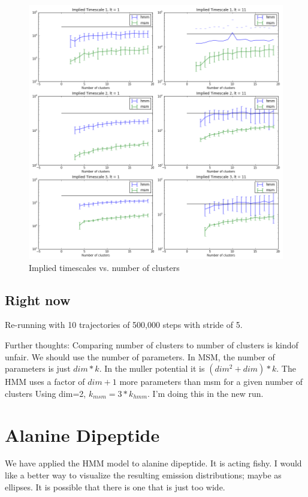\documentclass[10pt]{article}
\begin{document}
\begin{figure}[htbp!]
	\centering
	\includegraphics[width=1.0\textwidth]{its_vs_k.png}
	\caption{Implied timescales vs. number of clusters}
	\label{its_vs_k}
\end{figure}

\subsection{Right now}
Re-running with 10 trajectories of 500,000 steps with stride of 5.

Further thoughts: Comparing number of clusters to number of clusters
is kindof unfair. We should use the number of parameters. In MSM, the number
of parameters is just $dim*k$. In the muller potential it is $(dim^2 + dim)*k$.
The HMM uses a factor of $dim+1$ more parameters than msm for a given number of clusters
Using dim=2, $k_{msm} = 3*k_{hmm}$. I'm doing this in the new run.

\section{Alanine Dipeptide}
We have applied the HMM model to alanine dipeptide. It is acting fishy.
I would like a better way to visualize the resulting emission distributions;
maybe as ellipses. It is possible that there is one that is just too wide.
\end{document}
